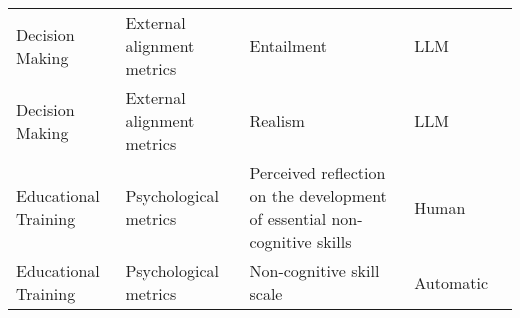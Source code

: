 \begin{small}
\begin{center}
\begin{longtable}{@{}p{}p{}p{}p{}p{}@{}}
Decision Making          & External alignment metrics          & Entailment                                                                                                                                                                                                  & LLM       & \cite{Li2024SchemaGuidedCC}                                                                                                                                                                                                                                                                                                                                                                                       \\
Decision Making          & External alignment metrics          & Realism                                                                                                                                                                                                     & LLM       & \cite{Li2024SchemaGuidedCC}                                                                                                                                                                                                                                                                                                                                                                                       \\
Educational Training     & Psychological metrics & Perceived reflection on the development of essential non-cognitive skills                                                                                                                                   & Human     & \cite{Yan2024SocialLS}                                                                                                                                                                                                                                                                                                                                                                                                     \\
Educational Training     & Psychological metrics & Non-cognitive skill scale                                                                                                                                                                                   & Automatic & \cite{Yan2024SocialLS}                                                                                                                                                                                                                                                                                                                                                                                                     \\

\end{longtable}
\end{center}
\end{small}
